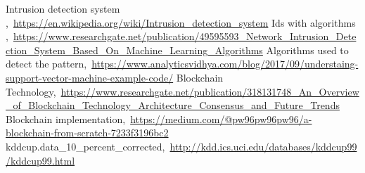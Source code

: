 \cleardoublepage
{}
{}
\begin{thebibliography}{99}

Intrusion detection system
,\ \url{https://en.wikipedia.org/wiki/Intrusion_detection_system}
Ids with algorithms ,\ \url{https://www.researchgate.net/publication/49595593_Network_Intrusion_Detection_System_Based_On_Machine_Learning_Algorithms}
Algorithms used to detect the pattern,\ \url{https://www.analyticsvidhya.com/blog/2017/09/understaing-support-vector-machine-example-code/}
Blockchain Technology,\ \url{https://www.researchgate.net/publication/318131748_An_Overview_of_Blockchain_Technology_Architecture_Consensus_and_Future_Trends}
Blockchain implementation,\ \url{https://medium.com/@pw96pw96pw96/a-blockchain-from-scratch-7233f3196bc2}
kddcup.data_10_percent_corrected,\ \url{http://kdd.ics.uci.edu/databases/kddcup99/kddcup99.html}
\end{thebibliography}

